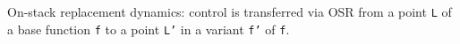 \label{fig:osr-dynamics} On-stack replacement dynamics: control is transferred via OSR from a point \texttt{L} of a base function \texttt{f} to a point \texttt{L'} in a variant \texttt{f'} of \texttt{f}.
  
  
  
  
  
  